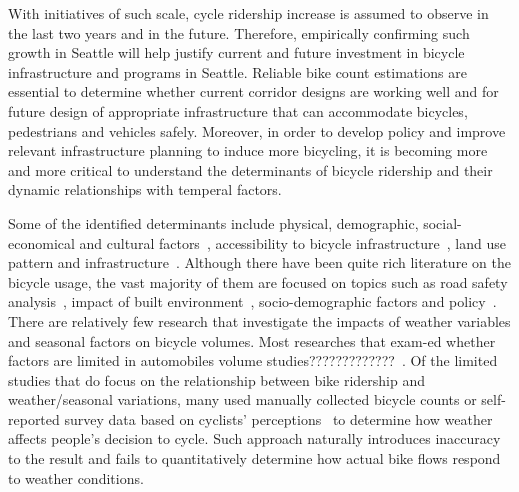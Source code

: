 \documentclass [11pt, proquest] {uwthesis}[2015/03/03]
\begin{document}
With initiatives of such scale, cycle ridership increase is assumed to observe in the last two years and in the future. Therefore, empirically confirming such growth in Seattle will help justify current and future investment in bicycle infrastructure and programs in Seattle. Reliable bike count estimations are essential to determine whether current corridor designs are working well and for future design of appropriate infrastructure that can accommodate bicycles, pedestrians and vehicles safely. 
Moreover, in order to develop policy and improve relevant infrastructure planning to induce more bicycling, it is becoming more and more critical to understand the determinants of bicycle ridership and their dynamic relationships with temperal factors. 

Some of the identified determinants include physical, demographic, social-economical and cultural factors~\cite{Xing10,Pucher10,Krizek09}, accessibility to bicycle infrastructure~\cite{Voros07}, land use pattern and infrastructure~\cite{Dunlap15}. Although there have been quite rich literature on the bicycle usage, the vast majority of them are focused on topics such as road safety analysis~\cite{Kim07}, impact of built environment~\cite{Pucher10}, socio-demographic factors and policy~\cite{Garrard08,Xing10}. There are relatively few research that investigate the impacts of weather variables and seasonal factors on bicycle volumes. Most researches that exam-ed whether factors are limited in automobiles volume studies?????????????~\cite{Miranda-Moreno:2011aa,Rose:2011aa,Nosal:2014aa,Rose07}. Of the limited studies that do focus on the relationship between bike ridership and weather/seasonal variations, many used manually collected bicycle counts or self-reported survey data based on cyclists' perceptions~\cite{Nankervis99,Winters07,Richardson00,Richardson06} to determine how weather affects people's decision to cycle. Such approach naturally introduces inaccuracy to the result and fails to quantitatively determine how actual bike flows respond to weather conditions. 



\end{document}
